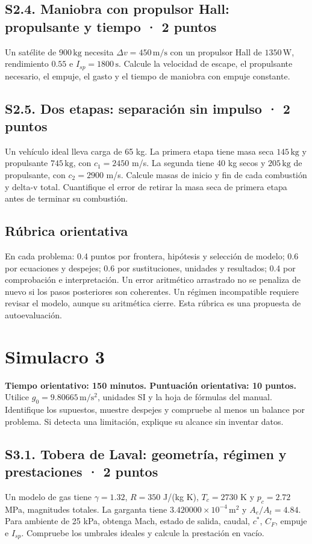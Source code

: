 \section{S2.4. Maniobra con propulsor Hall: propulsante y tiempo · 2 puntos}
Un satélite de $900\,\mathrm{kg}$ necesita $\Delta v=450\,\mathrm{m/s}$ con un propulsor Hall de $1350\,\mathrm W$, rendimiento $0.55$ e $I_{sp}=1800\,\mathrm s$. Calcule la velocidad de escape, el propulsante necesario, el empuje, el gasto y el tiempo de maniobra con empuje constante.

\section{S2.5. Dos etapas: separación sin impulso · 2 puntos}
Un vehículo ideal lleva carga de 65 kg. La primera etapa tiene masa seca $145\,\mathrm{kg}$ y propulsante $745\,\mathrm{kg}$, con $c_1=2450$ m/s. La segunda tiene 40 kg secos y $205\,\mathrm{kg}$ de propulsante, con $c_2=2900$ m/s. Calcule masas de inicio y fin de cada combustión y delta-v total. Cuantifique el error de retirar la masa seca de primera etapa antes de terminar su combustión.

\section{Rúbrica orientativa} En cada problema: 0.4 puntos por frontera, hipótesis y selección de modelo; 0.6 por ecuaciones y despejes; 0.6 por sustituciones, unidades y resultados; 0.4 por comprobación e interpretación. Un error aritmético arrastrado no se penaliza de nuevo si los pasos posteriores son coherentes. Un régimen incompatible requiere revisar el modelo, aunque su aritmética cierre. Esta rúbrica es una propuesta de autoevaluación.
\chapter{Simulacro 3}
\textbf{Tiempo orientativo: 150 minutos. Puntuación orientativa: 10 puntos.} Utilice $g_0=9.80665\,\mathrm{m/s^2}$, unidades SI y la hoja de fórmulas del manual. Identifique los supuestos, muestre despejes y compruebe al menos un balance por problema. Si detecta una limitación, explique su alcance sin inventar datos.
\section{S3.1. Tobera de Laval: geometría, régimen y prestaciones · 2 puntos}
Un modelo de gas tiene $\gamma=1.32$, $R=350$ J/(kg K), $T_c=2730$ K y $p_c=2.72$ MPa, magnitudes totales. La garganta tiene $3.420000\times10^{-4}\,\mathrm{m^2}$ y $A_e/A_t=4.84$. Para ambiente de 25 kPa, obtenga Mach, estado de salida, caudal, $c^*$, $C_F$, empuje e $I_{sp}$. Compruebe los umbrales ideales y calcule la prestación en vacío.

